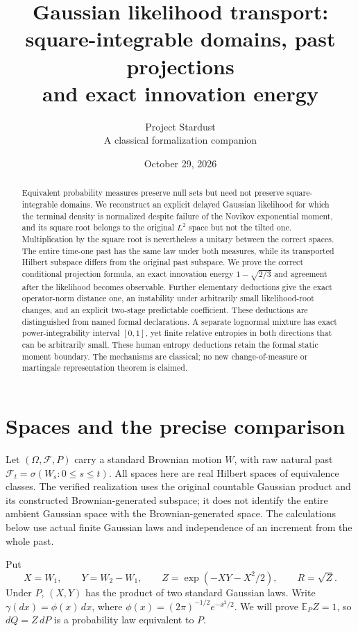 \documentclass[11pt]{article}
\title{Gaussian likelihood transport:\\square-integrable domains, past projections\\and exact innovation energy}
\author{Project Stardust\\\small A classical formalization companion}
\date{October 29, 2026}
\theoremstyle{remark}\newtheorem{remark}[theorem]{Remark}
\newcommand{\E}{\mathbb E}
\newcommand{\F}{\mathcal F}
\begin{document}
\maketitle
\begin{abstract}
Equivalent probability measures preserve null sets but need not preserve square-integrable domains. We reconstruct an explicit delayed Gaussian likelihood for which the terminal density is normalized despite failure of the Novikov exponential moment, and its square root belongs to the original $L^2$ space but not the tilted one. Multiplication by the square root is nevertheless a unitary between the correct spaces. The entire time-one past has the same law under both measures, while its transported Hilbert subspace differs from the original past subspace. We prove the correct conditional projection formula, an exact innovation energy $1-\sqrt{2/3}$ and agreement after the likelihood becomes observable. Further elementary deductions give the exact operator-norm distance one, an instability under arbitrarily small likelihood-root changes, and an explicit two-stage predictable coefficient. These deductions are distinguished from named formal declarations. A separate lognormal mixture has exact power-integrability interval $[0,1]$, yet finite relative entropies in both directions that can be arbitrarily small. These human entropy deductions retain the formal static moment boundary. The mechanisms are classical; no new change-of-measure or martingale representation theorem is claimed.
\end{abstract}

\section{Spaces and the precise comparison}
Let $(\Omega,\F,P)$ carry a standard Brownian motion $W$, with raw natural past
$\F_t=\sigma(W_s:0\le s\le t)$. All spaces here are real Hilbert spaces of equivalence classes. The verified realization uses the original countable Gaussian product and its constructed Brownian-generated subspace; it does not identify the entire ambient Gaussian space with the Brownian-generated space. The calculations below use actual finite Gaussian laws and independence of an increment from the whole past.

Put
\begin{equation}\label{eq:XY}
 X=W_1,\qquad Y=W_2-W_1,\qquad
 Z=\exp(-XY-X^2/2),\qquad R=\sqrt Z.
\end{equation}
Under $P$, $(X,Y)$ has the product of two standard Gaussian laws. Write
$\gamma(dx)=\phi(x)\,dx$, where
$\phi(x)=(2\pi)^{-1/2}e^{-x^2/2}$. We will prove $\E_P Z=1$, so $dQ=Z\,dP$ is a probability law equivalent to $P$.
\end{document}

